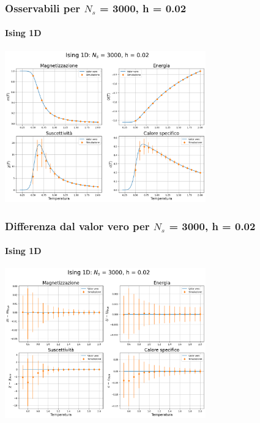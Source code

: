 \begin{frame}
    \frametitle{Osservabili per $N_s$ = 3000, h = 0.02}
    \framesubtitle{Ising 1D}

    \centering
    \includegraphics[width=0.65\textwidth]{Immagini/backupIsing1D/obs_3000_0.02.png}

\end{frame}



\begin{frame}
    \frametitle{Differenza dal valor vero per $N_s$ = 3000, h = 0.02}
    \framesubtitle{Ising 1D}

    \centering
    \includegraphics[width=0.65\textwidth]{Immagini/backupIsing1D/obs_3000_0.02_diff.png}

\end{frame}



